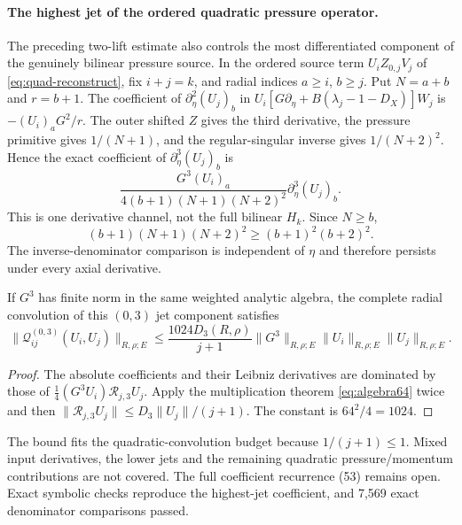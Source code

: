 \paragraph{The highest jet of the ordered quadratic pressure operator.}
The preceding two-lift estimate also controls the most differentiated component of the genuinely bilinear pressure source. In the ordered source term $U_iZ_{0,j}V_j$ of \eqref{eq:quad-reconstruct}, fix $i+j=k$, and radial indices $a\ge i$, $b\ge j$. Put $N=a+b$ and $r=b+1$. The coefficient of $\partial_\eta^2(U_j)_b$ in
$U_i[G\partial_\eta+B(\lambda_j-1-D_X)]W_j$
is $-(U_i)_aG^2/r$. The outer shifted $Z$ gives the third derivative, the pressure primitive gives $1/(N+1)$, and the regular-singular inverse gives $1/(N+2)^2$. Hence the exact coefficient of $\partial_\eta^3(U_j)_b$ is
\begin{equation}\label{eq:quad-highest-jet}
\frac{G^3(U_i)_a}{4(b+1)(N+1)(N+2)^2}
\partial_\eta^3(U_j)_b.
\end{equation}
This is one derivative channel, not the full bilinear $H_k$.
Since $N\ge b$,
\[
(b+1)(N+1)(N+2)^2\ge(b+1)^2(b+2)^2.
\]
The inverse-denominator comparison is independent of $\eta$ and therefore persists under every axial derivative.

\begin{corollary}
\label{cor:quad-highest}
If $G^3$ has finite norm in the same weighted analytic algebra, the complete radial convolution of this $(0,3)$ jet component satisfies
\begin{equation}\label{eq:quad-highest-bound}
\|\mathcal Q_{ij}^{(0,3)}(U_i,U_j)\|_{R,\rho;E}
\le\frac{1024D_3(R,\rho)}{j+1}
\|G^3\|_{R,\rho;E}\|U_i\|_{R,\rho;E}\|U_j\|_{R,\rho;E}.
\end{equation}
\end{corollary}
\begin{proof}
The absolute coefficients and their Leibniz derivatives are dominated by those of
$\tfrac14(G^3U_i)\mathcal R_{j,3}U_j$.
Apply the multiplication theorem \eqref{eq:algebra64} twice and then
$\|\mathcal R_{j,3}U_j\|\le D_3\|U_j\|/(j+1)$.
The constant is $64^2/4=1024$.
\end{proof}
The bound fits the quadratic-convolution budget because $1/(j+1)\le1$.
Mixed input derivatives, the lower jets and the remaining quadratic
pressure/momentum contributions are not covered. The full coefficient
recurrence (53) remains open. Exact symbolic checks reproduce the
highest-jet coefficient, and 7,569 exact denominator comparisons passed.
